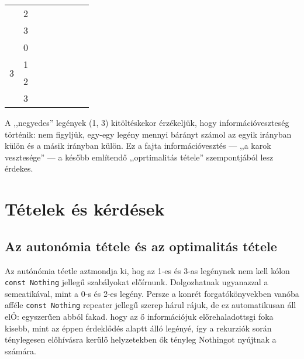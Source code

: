 \documentclass{article}
\newcommand{\blk}{\cellcolor{darkgray}}
\newcommand{\red}{\cellcolor{red!33}}
\newcommand{\grn}{\cellcolor{green!33}}
\newcommand{\just}[1]{\boxed{#1}}%
\newcommand{\incl}{\mathbf{incl}}
\newcommand{\excl}{\mathbf{excl}}
\begin{document}
\begin{table}[H]
\begin{tabular}{c|c|c|c|c|c|c|c|}
				               &  2                        &    \blk           & \blk           & \red\just\excl & \grn\just\incl & \blk           & \blk           \\\cline{2-8}
				               &  3                        &    \blk           & \blk           & \red\just\excl & \grn\just\incl & \blk           & \blk           \\\hline\hline
			\multirow{4}{*}{3}     &  0                        &    \blk           & \blk           & \blk           & \blk           & \blk           & \blk           \\\cline{2-8}
				               &  1                        &    \blk           & \blk           & \blk           & \blk           & \blk           & \blk           \\\cline{2-8}
				               &  2                        &    \blk           & \blk           & \blk           & \blk           & \blk           & \blk           \\\cline{2-8}
				               &  3                        &    \blk           & \blk           & \blk           & \blk           & \blk           & \blk           \\\hline
		\end{tabular}
	\end{table}



	A ,,negyedes'' legények (1, 3) kitöltéskekor érzékeljük, hogy információveszteség történik: nem figyljük, egy-egy legény mennyi bárányt számol az egyik irányban külön és a másik irányban külön.
	Ez a fajta információvesztés --- ,,a karok vesztesége'' --- a később említendő ,,oprtimalitás tétele'' szempontjából lesz érdekes.

	\section{Tételek és kérdések}

	\subsection{Az autonómia tétele és az optimalitás tétele}

	Az autónómia téetle aztmondja ki, hog az 1-es és 3-as legénynek nem kell kólon \texttt{const Nothing} jellegű szabályokat előírnunk.
	Dolgozhatnak ugyanazzal a semeatikával, mint a 0-s és 2-es legény. Persze a konrét forgatókönyvekben vanóba afféle \texttt{const Nothing} repeater jellegű szerep hárul rájuk,
	de ez automatikusan áll elŐ: egyszerűen abból fakad. hogy az ő információjuk előrehaladottsgi foka kisebb, mint az éppen érdeklődés alaptt álló legényé, így a rekurziók során ténylegesen előhívásra kerülő helyzetekben ők tényleg Nothingot nyújtnak a számára.
\end{document}
